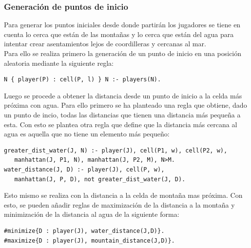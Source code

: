 \subsubsection{Generación de puntos de inicio}

Para generar los puntos iniciales desde donde partirán los jugadores se tiene en cuenta lo cerca que están de las montañas y lo cerca que están del agua para intentar crear asentamientos lejos de coordilleras y cercanas al mar. \\

Para ello se realiza primero la generación de un punto de inicio en una posición aleatoria mediante la siguiente regla: \\

\begin{lstlisting}[label=lst:water]
N { player(P) : cell(P, l) } N :- players(N).
\end{lstlisting}

\hspace{1em}

Luego se procede a obtener la distancia desde un punto de inicio a la celda más próxima con agua. Para ello primero se ha planteado una regla que obtiene, dado un punto de incio, todas las distancias que tienen una distancia más pequeña a esta. Con esto se plantea otra regla que define que la distancia más cercana al agua es aquella que no tiene un elemento más pequeño: \\

\begin{lstlisting}[label=lst:water]
greater_dist_water(J, N) :- player(J), cell(P1, w), cell(P2, w),
   manhattan(J, P1, N), manhattan(J, P2, M), N>M.
water_distance(J, D) :- player(J), cell(P, w),
   manhattan(J, P, D), not greater_dist_water(J, D).
\end{lstlisting}

\hspace{1em}

Esto mismo se realiza con la distancia a la celda de montaña mas próxima. Con esto, se pueden añadir reglas de maximización de la distancia a la montaña y minimización de la distancia al agua de la siguiente forma: \\

\begin{lstlisting}[label=lst:water]
#minimize{D : player(J), water_distance(J,D)}.
#maximize{D : player(J), mountain_distance(J,D)}.
\end{lstlisting}

\hspace{1em}

